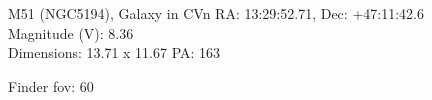 \begin{block}{M51 (NGC5194), Galaxy in CVn}
    RA: 13:29:52.71, Dec: +47:11:42.6 \\ 
    Magnitude (V): 8.36 \\ 
    Dimensions: 13.71 x 11.67 PA: 163 

    Finder fov: 60 
\end{block}